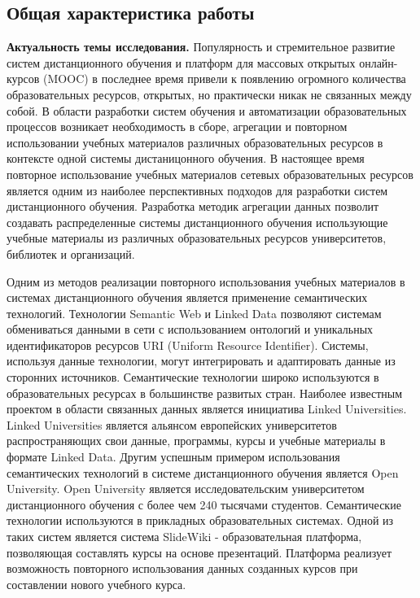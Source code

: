 \subsection*{\Large Общая характеристика работы}
\fontsize{14pt}{15pt}\selectfont


\textbf{Актуальность темы исследования.}
Популярность и стремительное развитие систем дистанционного обучения и платформ для массовых открытых онлайн-курсов (MOOC) в последнее время привели к появлению огромного количества образовательных ресурсов, открытых, но практически никак не связанных между собой. В области разработки систем обучения и автоматизации образовательных процессов возникает необходимость в сборе, агрегации и повторном использовании учебных материалов различных образовательных ресурсов в контексте одной системы дистаницонного обучения. В настоящее время повторное использование учебных материалов сетевых образовательных ресурсов является одним из наиболее перспективных подходов для разработки систем дистанционного обучения. Разработка методик агрегации данных позволит создавать распределенные системы дистанционного обучения использующие учебные материалы из различных образовательных ресурсов университетов, библиотек и организаций.

Одним из методов реализации повторного использования учебных материалов в системах дистанционного обучения является применение семантических технологий. Технологии Semantic Web и Linked Data позволяют системам обмениваться данными в сети с использованием онтологий и уникальных идентификаторов ресурсов URI (Uniform Resource Identifier). Системы, используя данные технологии, могут интегрировать и адаптировать данные из сторонних источников. Семантические технологии широко используются в образовательных ресурсах в большинстве развитых стран. Наиболее известным проектом в области связанных данных является инициатива Linked Universities. Linked Universities является альянсом европейских университетов распространяющих свои данные, программы, курсы и учебные материалы в формате Linked Data.
Другим успешным примером использования семантических технологий в системе дистанционного обучения является Open University. Open University является исследовательским университетом дистанционного обучения с более чем 240 тысячами студентов. Семантические технологии используются в прикладных образовательных системах. Одной из таких систем является система SlideWiki - образовательная платформа, позволяющая составлять курсы на основе презентаций. Платформа реализует возможность повторного использования данных созданных курсов при составлении нового учебного курса.


